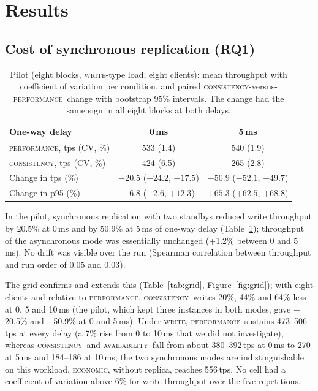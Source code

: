 \documentclass[smallextended]{svjour3}
\newcommand{\perf}{\textsc{performance}}
\newcommand{\cons}{\textsc{consistency}}
\newcommand{\avail}{\textsc{availability}}
\newcommand{\econ}{\textsc{economic}}
\begin{document}
\section{Results}\label{sec:results}
\subsection{Cost of synchronous replication (RQ1)}
\begin{table}[t]
\centering\footnotesize
\begin{tabular}{lcc}
\toprule
One-way delay & 0\,ms & 5\,ms \\
\midrule
\perf, tps (CV, \%) & 533 (1.4) & 540 (1.9) \\
\cons, tps (CV, \%) & 424 (6.5) & 265 (2.8) \\
Change in tps (\%) & $-20.5$ ($-24.2$, $-17.5$) & $-50.9$ ($-52.1$, $-49.7$) \\
Change in p95 (\%) & $+6.8$ ($+2.6$, $+12.3$) & $+65.3$ ($+62.5$, $+68.8$) \\
\bottomrule
\end{tabular}
\caption{Pilot (eight blocks, \textsc{write}-type load, eight clients): mean throughput with coefficient of variation per condition, and paired \cons-versus-\perf\ change with bootstrap 95\% intervals. The change had the same sign in all eight blocks at both delays.}\label{tab:pilot}
\end{table}

In the pilot, synchronous replication with two standbys reduced write throughput by 20.5\% at 0\,ms and by 50.9\% at 5\,ms of one-way delay (Table~\ref{tab:pilot}); throughput of the asynchronous mode was essentially unchanged (+1.2\% between 0 and 5\,ms). No drift was visible over the run (Spearman correlation between throughput and run order of 0.05 and 0.03).

The grid confirms and extends this (Table~\ref{tab:grid}, Figure~\ref{fig:grid}); with eight clients and relative to \perf, \cons\ writes 20\%, 44\% and 64\% less at 0, 5 and 10\,ms (the pilot, which kept three instances in both modes, gave $-$20.5\% and $-$50.9\% at 0 and 5\,ms). Under \textsc{write}, \perf\ sustains 473--506\,tps at every delay (a 7\% rise from 0 to 10\,ms that we did not investigate), whereas \cons\ and \avail\ fall from about 380--392\,tps at 0\,ms to 270 at 5\,ms and 184--186 at 10\,ms; the two synchronous modes are indistinguishable on this workload. \econ, without replica, reaches 556\,tps. No cell had a coefficient of variation above 6\% for write throughput over the five repetitions.
\end{document}
